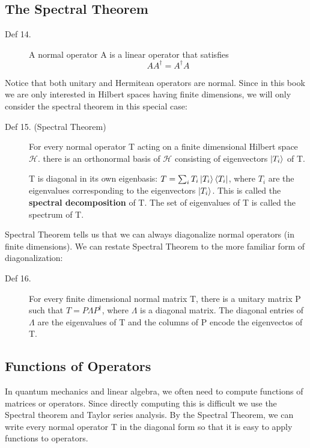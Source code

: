 \documentclass[12pt]{article}
\begin{document}
\subsection{The Spectral Theorem}

\begin{description}
    \item[Def 14.] A normal operator A is a linear operator that satisfies 
    \begin{equation}
        AA^\dagger = A^\dagger A
    \end{equation}
\end{description}

Notice that both unitary and Hermitean operators are normal. Since in this book we are only interested in Hilbert spaces having finite dimensions, we will only consider the spectral theorem in this special case:

\begin{description}
    \item[Def 15. (Spectral Theorem)] For every normal operator T acting on a finite dimensional Hilbert space \(\mathcal{H}\). there is an orthonormal basis of \(\mathcal{H}\) consisting of eigenvectors \(\ket{T_i}\) of T.

    T is diagonal in its own eigenbasis: \(T = \sum_{i} T_i\ket{T_i}\bra{T_i}\), where \(T_i\) are the eigenvalues corresponding to the eigenvectors \(\ket{T_i}\). This is called the \textbf{spectral decomposition} of T. The set of eigenvalues of T is called the spectrum of T.
\end{description}

Spectral Theorem tells us that we can always diagonalize normal operators (in finite dimensions). We can restate Spectral Theorem to the more familiar form of diagonalization:

\begin{description}
    \item[Def 16.] For every finite dimensional normal matrix T, there is a unitary matrix P such that \(T = P\Lambda P^\dagger\), where \(\Lambda\) is a diagonal matrix. The diagonal entries of \(\Lambda\) are the eigenvalues of T and the columns of P encode the eigenvectos of T.
\end{description}

\subsection{Functions of Operators}

\hspace{0.5cm} In quantum mechanics and linear algebra, we often need to compute functions of matrices or operators. Since directly computing this is difficult we use the Spectral theorem and Taylor series analysis. By the Spectral Theorem, we can write every normal operator T in the diagonal form so that it is easy to apply functions to operators.
\end{document}
